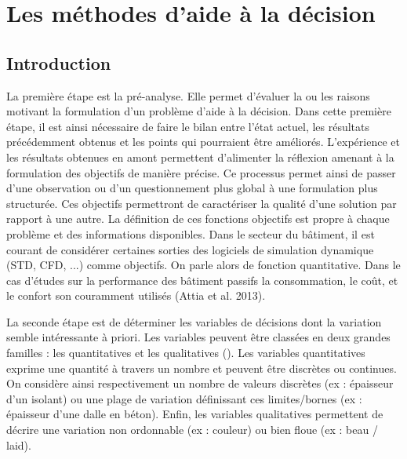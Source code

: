 
\section{Les méthodes d’aide à la décision} %
\label{sec:les_methodes_d_aide_à_la_decision}

\subsection{Introduction} %
\label{sub:introduction}


La première étape est la pré-analyse. Elle permet d’évaluer la ou les raisons
motivant la formulation d’un problème d’aide à la décision. Dans cette première étape,
il est ainsi nécessaire de faire le bilan entre l’état actuel, les résultats précédemment
obtenus et les points qui pourraient être améliorés.
L’expérience et les résultats obtenues en amont permettent d’alimenter
la réflexion amenant à la formulation des objectifs de manière précise.
Ce processus permet ainsi de passer d’une observation ou d’un questionnement plus global
à une formulation plus structurée.
Ces objectifs permettront de caractériser la qualité d’une solution par rapport à une autre.
La définition de ces fonctions objectifs est propre à chaque problème et des informations disponibles.
Dans le secteur du bâtiment, il est courant de considérer certaines sorties des
logiciels de simulation dynamique (STD, CFD, ...) comme objectifs. On parle alors
de fonction quantitative.
Dans le cas d’études sur la performance des bâtiment passifs la consommation, le coût,
et le confort son couramment utilisés (Attia et al. 2013).

La seconde étape est de déterminer les variables de décisions dont la variation
semble intéressante à priori. Les variables peuvent être classées en deux grandes
familles : les quantitatives et les qualitatives ().
Les variables quantitatives exprime une quantité à travers un nombre et
peuvent être discrètes ou continues. On considère ainsi respectivement un nombre de
valeurs discrètes (ex : épaisseur d’un isolant) ou une plage de variation définissant
ces limites/bornes (ex : épaisseur d’une dalle en béton).
Enfin, les variables qualitatives permettent de décrire une variation non ordonnable
(ex : couleur) ou bien floue (ex : beau / laid).

